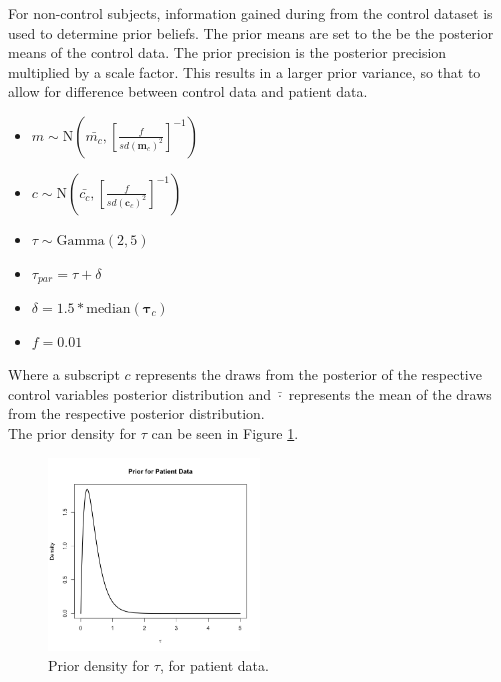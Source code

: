\documentclass[a4paper, 12pt]{article}
\begin{document}
For non-control subjects, information gained during from the control dataset is used to determine prior beliefs. The prior means are set to the be the posterior means of the control data. The prior precision is the posterior precision multiplied by a scale factor. This results in a larger prior variance, so that to allow for difference between control data and patient data.\\ 

\begin{minipage}{0.5\textwidth}
    \begin{itemize}
        \item[] $m\sim \text{N}\left( \bar{m_c},\left[\frac{f}{sd(\boldsymbol{m}_c)^2}\right]^{-1}\right) $
        \item[] $c\sim\text{N}\left(\bar{c_c}, \left[\frac{f}{sd(\boldsymbol{c}_c)^2}\right]^{-1}\right) $
        \item[] $\tau\sim\text{Gamma}\left(2,5\right)$
    \end{itemize}
\end{minipage}
\begin{minipage}{0.5\textwidth}
    \begin{itemize}
        \item[] $\tau_{par} = \tau + \delta $
        \item[] $\delta = 1.5*\text{median}(\boldsymbol{\tau}_c)$
        \item[] $f=0.01$
    \end{itemize}
\end{minipage}

Where a subscript $c$ represents the draws from the posterior of the respective control variables posterior distribution and $ \bar{\cdot} $ represents the mean of the draws from the respective posterior distribution.\\

The prior density for $\tau$ can be seen in Figure \ref{fig:tau_prior_pat}.
\begin{figure}[H]
    \centering
    \includegraphics[width=0.5\textwidth]{tau_prior_pat.png}
    \caption{Prior density for $\tau$, for patient data.}
    \label{fig:tau_prior_pat}
\end{figure}
\end{document}
